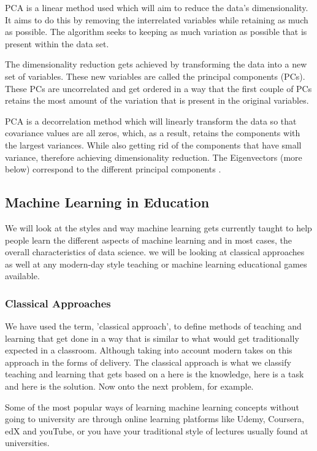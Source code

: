 		PCA is a linear method used which will aim to reduce the data's dimensionality. It aims to do this by removing the interrelated variables while retaining as much as possible. The algorithm seeks to keeping as much variation as possible that is present within the data set.
		
		The dimensionality reduction gets achieved by transforming the data into a new set of variables. These new variables are called the principal components (PCs). These PCs are uncorrelated and get ordered in a way that the first couple of PCs retains the most amount of the variation that is present in the original variables.
		
		PCA is a decorrelation method which will linearly transform the data so that covariance values are all zeros, which, as a result, retains the components with the largest variances. While also getting rid of the components that have small variance, therefore achieving dimensionality reduction. The Eigenvectors (more below) correspond to the different principal components \cite{friedman2001elements}. 
	
	\subsection{Machine Learning in Education}
		\label{seb_sec:ml_in_learning}
	
	We will look at the styles and way machine learning gets currently taught to help people learn the different aspects of machine learning and in most cases, the overall characteristics of data science. we will be looking at classical approaches as well at any modern-day style teaching or machine learning educational games available. 
	
	\subsubsection{Classical Approaches}
		\label{sub_sec:classical_teach_learn}
		
		We have used the term, 'classical approach', to define methods of teaching and learning that get done in a way that is similar to what would get traditionally expected in a classroom.  Although taking into account modern takes on this approach in the forms of delivery. The classical approach is what we classify teaching and learning that gets based on a here is the knowledge, here is a task and here is the solution. Now onto the next problem, for example.
		
		Some of the most popular ways of learning machine learning concepts without going to university are through online learning platforms like Udemy, Coursera, edX and youTube, or you have your traditional style of lectures usually found at universities.
		
